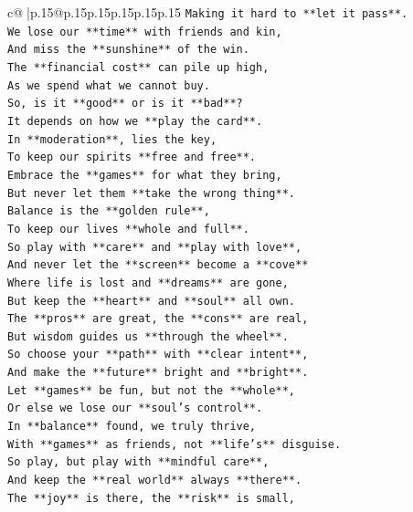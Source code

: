 \documentclass{article}
\begin{document}
{\begin{supertabular}{c@{$\;$}|p{.15\linewidth}@{}p{.15\linewidth}p{.15\linewidth}p{.15\linewidth}p{.15\linewidth}p{.15\linewidth}}
{{{\texttt{Making it hard to **let it pass**.} \\
\texttt{We lose our **time** with friends and kin,} \\
\texttt{And miss the **sunshine** of the win.} \\
\texttt{The **financial cost** can pile up high,} \\
\texttt{As we spend what we cannot buy.} \\
\texttt{So, is it **good** or is it **bad**?} \\
\texttt{It depends on how we **play the card**.} \\
\texttt{In **moderation**, lies the key,} \\
\texttt{To keep our spirits **free and free**.} \\
\texttt{Embrace the **games** for what they bring,} \\
\texttt{But never let them **take the wrong thing**.} \\
\texttt{Balance is the **golden rule**,} \\
\texttt{To keep our lives **whole and full**.} \\
\texttt{So play with **care** and **play with love**,} \\
\texttt{And never let the **screen** become a **cove**} \\
\texttt{Where life is lost and **dreams** are gone,} \\
\texttt{But keep the **heart** and **soul** all own.} \\
\texttt{The **pros** are great, the **cons** are real,} \\
\texttt{But wisdom guides us **through the wheel**.} \\
\texttt{So choose your **path** with **clear intent**,} \\
\texttt{And make the **future** bright and **bright**.} \\
\texttt{Let **games** be fun, but not the **whole**,} \\
\texttt{Or else we lose our **soul's control**.} \\
\texttt{In **balance** found, we truly thrive,} \\
\texttt{With **games** as friends, not **life's** disguise.} \\
\texttt{So play, but play with **mindful care**,} \\
\texttt{And keep the **real world** always **there**.} \\
\texttt{The **joy** is there, the **risk** is small,} \\
}}}
\end{supertabular}}
\end{document}
